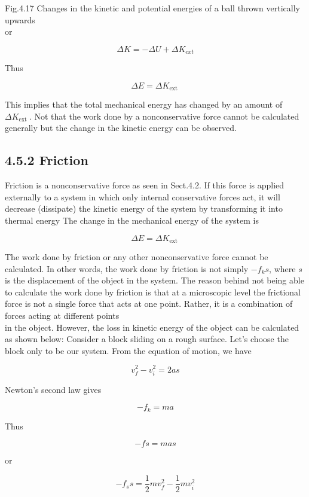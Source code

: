 \documentclass[10pt]{article}
\begin{document}
Fig.4.17 Changes in the kinetic and potential energies of a ball thrown vertically upwards\\
or

$$
\Delta K=-\Delta U+\Delta K_{e x t}
$$

Thus


\begin{equation*}
\Delta E=\Delta K_{\text {ext }} \tag{4.3}
\end{equation*}


This implies that the total mechanical energy has changed by an amount of $\Delta K_{\text {ext }}$. Not that the work done by a nonconservative force cannot be calculated generally but the change in the kinetic energy can be observed.

\subsection*{4.5.2 Friction}
Friction is a nonconservative force as seen in Sect.4.2. If this force is applied externally to a system in which only internal conservative forces act, it will decrease (dissipate) the kinetic energy of the system by transforming it into thermal energy The change in the mechanical energy of the system is

$$
\Delta E=\Delta K_{\text {ext }}
$$

The work done by friction or any other nonconservative force cannot be calculated. In other words, the work done by friction is not simply $-f_{k} s$, where $s$ is the displacement of the object in the system. The reason behind not being able to calculate the work done by friction is that at a microscopic level the frictional force is not a single force that acts at one point. Rather, it is a combination of forces acting at different points\\
in the object. However, the loss in kinetic energy of the object can be calculated as shown below: Consider a block sliding on a rough surface. Let's choose the block only to be our system. From the equation of motion, we have

$$
v_{f}^{2}-v_{i}^{2}=2 a s
$$

Newton's second law gives

$$
-f_{k}=m a
$$

Thus

$$
-f s=m a s
$$

or

$$
-f_{s} s=\frac{1}{2} m v_{f}^{2}-\frac{1}{2} m v_{i}^{2}
$$
\end{document}

